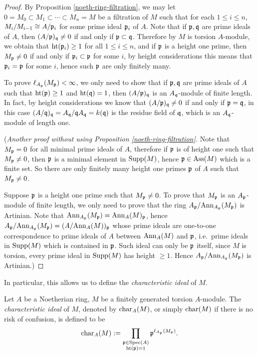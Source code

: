 \begin{proof}
\leanok
By Proposition \ref{noeth-ring-filtration},
we may let $0=M_0\subset M_1\subset\cdots\subset M_n=M$ be a filtration of $M$
such that for each $1\leq i\leq n$,
$M_i/M_{i-1}\cong A/{\mathfrak{p}}_i$ for some prime ideal ${\mathfrak{p}}_i$ of $A$.
Note that if ${\mathfrak{p}},{\mathfrak{q}}$ are prime ideals of $A$,
then $(A/{\mathfrak{p}})_{\mathfrak{q}}\neq 0$ if and only if ${\mathfrak{p}}\subset{\mathfrak{q}}$.
Therefore by $M$ is torsion $A$-module, we obtain that ${\mathrm{ht}}({\mathfrak{p}}_i)\geq 1$
for all $1\leq i\leq n$,
and if ${\mathfrak{p}}$ is a height one prime, then $M_{\mathfrak{p}}\neq 0$
if and only if ${\mathfrak{p}}_i\subset{\mathfrak{p}}$ for some $i$,
by height considerations this means that ${\mathfrak{p}}_i={\mathfrak{p}}$ for some $i$,
hence such ${\mathfrak{p}}$ are only finitely many.

To prove $\ell_{A_{\mathfrak{p}}}(M_{\mathfrak{p}})<\infty$,
we only need to show that if ${\mathfrak{p}},{\mathfrak{q}}$ are prime ideals of $A$
such that ${\mathrm{ht}}({\mathfrak{p}})\geq 1$ and ${\mathrm{ht}}({\mathfrak{q}})=1$,
then $(A/{\mathfrak{p}})_{\mathfrak{q}}$ is an $A_{\mathfrak{q}}$-module of finite length.
In fact, by height considerations we know that $(A/{\mathfrak{p}})_{\mathfrak{q}}\neq 0$
if and only if ${\mathfrak{p}}={\mathfrak{q}}$, in this case $(A/{\mathfrak{q}})_{\mathfrak{q}}=A_{\mathfrak{q}}/{\mathfrak{q}} A_{\mathfrak{q}}
=k({\mathfrak{q}})$ is the residue field of ${\mathfrak{q}}$, which is
an $A_{\mathfrak{q}}$-module of length one.

(\emph{Another proof without using Proposition \ref{noeth-ring-filtration}.}
Note that $M_{\mathfrak{p}}=0$ for all minimal prime ideals of $A$,
therefore if ${\mathfrak{p}}$ is of height one such that $M_{\mathfrak{p}}\neq 0$,
then ${\mathfrak{p}}$ is a minimal element in ${\mathrm{Supp}}(M)$, hence ${\mathfrak{p}}\in\operatorname{Ass}(M)$
which is a finite set.
So there are only finitely
many height one primes ${\mathfrak{p}}$ of $A$ such that $M_{\mathfrak{p}}\neq 0$.

Suppose ${\mathfrak{p}}$ is a height one prime such that $M_{\mathfrak{p}}\neq 0$.
To prove that $M_{\mathfrak{p}}$ is an $A_{\mathfrak{p}}$-module of finite length,
we only need to prove that the ring $A_{\mathfrak{p}}/{\mathrm{Ann}}_{A_{\mathfrak{p}}}(M_{\mathfrak{p}})$
is Artinian. Note that ${\mathrm{Ann}}_{A_{\mathfrak{p}}}(M_{\mathfrak{p}})={\mathrm{Ann}}_A(M)_{\mathfrak{p}}$,
hence $A_{\mathfrak{p}}/{\mathrm{Ann}}_{A_{\mathfrak{p}}}(M_{\mathfrak{p}})=(A/{\mathrm{Ann}}_A(M))_{\mathfrak{p}}$
whose prime ideals are one-to-one correspondence to prime ideals
of $A$ between ${\mathrm{Ann}}_A(M)$ and ${\mathfrak{p}}$,
i.e.~prime ideals in ${\mathrm{Supp}}(M)$ which is contained in ${\mathfrak{p}}$.
Such ideal can only be ${\mathfrak{p}}$ itself,
since $M$ is torsion, every prime ideal in ${\mathrm{Supp}}(M)$ has height $\geq 1$.
Hence $A_{\mathfrak{p}}/{\mathrm{Ann}}_{A_{\mathfrak{p}}}(M_{\mathfrak{p}})$
is Artinian.)
\end{proof}

In particular, this allows us to define the \emph{characteristic ideal} of $M$.

\begin{definition}
\label{char-ideal}
\leanok
Let $A$ be a Noetherian ring, $M$ be a
finitely generated torsion $A$-module.
The \emph{characteristic ideal} of $M$,
denoted by $\operatorname{char}_A(M)$, or simply $\operatorname{char}(M)$ if there is no risk of confusion, is defined to be
$$
\operatorname{char}_A(M):=\prod_{\substack{{\mathfrak{p}}\in{\mathrm{Spec}}(A)\\
{\mathrm{ht}}({\mathfrak{p}})=1}}{\mathfrak{p}}^{\ell_{A_{\mathfrak{p}}}(M_{\mathfrak{p}})}.
$$
\end{definition}

